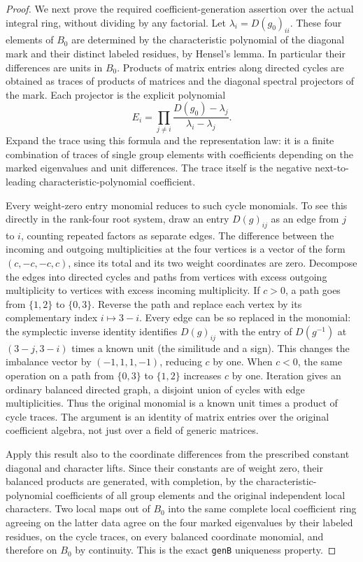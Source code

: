 \begin{proof}
We next prove the required coefficient-generation
assertion over the actual integral ring, without dividing
by any factorial. Let $\lambda_i=D(g_0)_{ii}$. These four
elements of $B_0$ are determined by the characteristic
polynomial of the diagonal mark and their distinct labeled
residues, by Hensel's lemma. In particular their differences
are units in $B_0$. Products of matrix entries along
directed cycles are obtained as traces of products of
matrices and the diagonal spectral projectors of the mark.
Each projector is the explicit polynomial
\[
 E_i=\prod_{j\ne i}
       \frac{D(g_0)-\lambda_j}{\lambda_i-\lambda_j}.
\]
Expand the trace using this formula and the representation
law: it is a finite combination of traces of single group
elements with coefficients depending on the marked
eigenvalues and unit differences. The trace itself is the
negative next-to-leading characteristic-polynomial
coefficient.

Every weight-zero entry monomial reduces to such cycle
monomials. To see this directly in the rank-four root
system, draw an entry $D(g)_{ij}$ as an edge from $j$ to
$i$, counting repeated factors as separate edges.
The difference between the incoming and outgoing
multiplicities at the four vertices is a vector of the form
$(c,-c,-c,c)$, since its total and its two weight coordinates
are zero. Decompose the edges into directed cycles and
paths from vertices with excess outgoing multiplicity to
vertices with excess incoming multiplicity. If $c>0$,
a path goes from $\{1,2\}$ to $\{0,3\}$. Reverse the path
and replace each vertex by its complementary index
$i\mapsto3-i$. Every edge can be so replaced in the monomial:
the symplectic inverse identity identifies $D(g)_{ij}$ with
the entry of $D(g^{-1})$ at $(3-j,3-i)$ times a known unit
(the similitude and a sign). This changes the imbalance
vector by $(-1,1,1,-1)$, reducing $c$ by one. When $c<0$,
the same operation on a path from $\{0,3\}$ to $\{1,2\}$
increases $c$ by one. Iteration gives an ordinary balanced
directed graph, a disjoint union of cycles with edge
multiplicities. Thus the original monomial is a known
unit times a product of cycle traces. The argument is
an identity of matrix entries over the original coefficient
algebra, not just over a field of generic matrices.

Apply this result also to the coordinate differences
from the prescribed constant diagonal and character
lifts. Since their constants are of weight zero, their
balanced products are generated, with completion, by
the characteristic-polynomial coefficients of all group
elements and the original independent local characters.
Two local maps out of $B_0$ into the same complete local
coefficient ring agreeing on the latter data agree on
the four marked eigenvalues by their labeled residues,
on the cycle traces, on every balanced coordinate
monomial, and therefore on $B_0$ by continuity. This is
the exact \texttt{genB} uniqueness property.


\end{proof}
